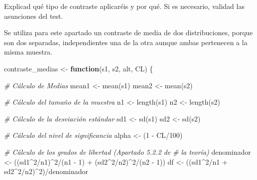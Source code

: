 \documentclass[
]{article}
\newenvironment{Shaded}{\begin{snugshade}}{\end{snugshade}}
\newcommand{\CommentTok}[1]{\textcolor[rgb]{0.56,0.35,0.01}{\textit{#1}}}
\newcommand{\ControlFlowTok}[1]{\textcolor[rgb]{0.13,0.29,0.53}{\textbf{#1}}}
\newcommand{\DecValTok}[1]{\textcolor[rgb]{0.00,0.00,0.81}{#1}}
\newcommand{\FunctionTok}[1]{\textcolor[rgb]{0.00,0.00,0.00}{#1}}
\newcommand{\NormalTok}[1]{#1}
\newcommand{\OtherTok}[1]{\textcolor[rgb]{0.56,0.35,0.01}{#1}}
\newcommand{\SpecialCharTok}[1]{\textcolor[rgb]{0.00,0.00,0.00}{#1}}
\begin{document}
Explicad qué tipo de contraste aplicaréis y por qué. Si es necesario,
validad las asunciones del test.

\vspace{0.3cm}

Se utiliza para este apartado un contraste de media de dos
distribuciones, porque son dos separadas, independientes una de la otra
aunque ambas pertenecen a la misma muestra.

\vspace{0.3cm}

\begin{Shaded}
\begin{Highlighting}[]
\NormalTok{contraste\_medias }\OtherTok{\textless{}{-}} \ControlFlowTok{function}\NormalTok{(s1, s2, alt, CL) \{}

    \CommentTok{\# Cálculo de Medias}
\NormalTok{    mean1 }\OtherTok{\textless{}{-}} \FunctionTok{mean}\NormalTok{(s1)}
\NormalTok{    mean2 }\OtherTok{\textless{}{-}} \FunctionTok{mean}\NormalTok{(s2)}

    \CommentTok{\# Cálculo del tamaño de la muestra}
\NormalTok{    n1 }\OtherTok{\textless{}{-}} \FunctionTok{length}\NormalTok{(s1)}
\NormalTok{    n2 }\OtherTok{\textless{}{-}} \FunctionTok{length}\NormalTok{(s2)}

    \CommentTok{\# Cálculo de la desviación estándar}
\NormalTok{    sd1 }\OtherTok{\textless{}{-}} \FunctionTok{sd}\NormalTok{(s1)}
\NormalTok{    sd2 }\OtherTok{\textless{}{-}} \FunctionTok{sd}\NormalTok{(s2)}

    \CommentTok{\# Cálculo del nivel de significancia}
\NormalTok{    alpha }\OtherTok{\textless{}{-}}\NormalTok{ (}\DecValTok{1} \SpecialCharTok{{-}}\NormalTok{ CL}\SpecialCharTok{/}\DecValTok{100}\NormalTok{)}

    \CommentTok{\# Cálculo de los grados de libertad (Apartado 5.2.2 de}
    \CommentTok{\# la teoría)}
\NormalTok{    denominador }\OtherTok{\textless{}{-}}\NormalTok{ ((sd1}\SpecialCharTok{\^{}}\DecValTok{2}\SpecialCharTok{/}\NormalTok{n1)}\SpecialCharTok{\^{}}\DecValTok{2}\SpecialCharTok{/}\NormalTok{(n1 }\SpecialCharTok{{-}} \DecValTok{1}\NormalTok{) }\SpecialCharTok{+}\NormalTok{ (sd2}\SpecialCharTok{\^{}}\DecValTok{2}\SpecialCharTok{/}\NormalTok{n2)}\SpecialCharTok{\^{}}\DecValTok{2}\SpecialCharTok{/}\NormalTok{(n2 }\SpecialCharTok{{-}}
        \DecValTok{1}\NormalTok{))}
\NormalTok{    df }\OtherTok{\textless{}{-}}\NormalTok{ ((sd1}\SpecialCharTok{\^{}}\DecValTok{2}\SpecialCharTok{/}\NormalTok{n1 }\SpecialCharTok{+}\NormalTok{ sd2}\SpecialCharTok{\^{}}\DecValTok{2}\SpecialCharTok{/}\NormalTok{n2)}\SpecialCharTok{\^{}}\DecValTok{2}\NormalTok{)}\SpecialCharTok{/}\NormalTok{denominador}


\end{Highlighting}
\end{Shaded}
\end{document}
